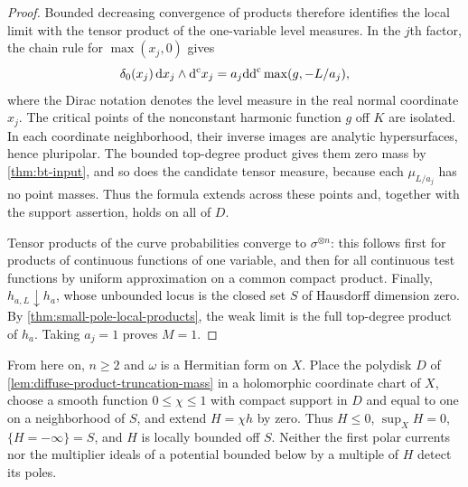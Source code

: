 \begin{proof}
Bounded decreasing convergence of products therefore identifies the local limit with the tensor product of the one-variable level measures. In the $j$th factor, the chain rule for $\max(x_j,0)$ gives
\[
 \delta_0(x_j)\,\mathrm dx_j\wedge\mathrm d^{\mathrm c} x_j
      =a_j\mathrm{dd}^{\mathrm{c}}\max(g,-L/a_j),
\]
where the Dirac notation denotes the level measure in the real normal coordinate $x_j$. The critical points of the nonconstant harmonic function $g$ off $K$ are isolated. In each coordinate neighborhood, their inverse images are analytic hypersurfaces, hence pluripolar. The bounded top-degree product gives them zero mass by \cref{thm:bt-input}, and so does the candidate tensor measure, because each $\mu_{L/a_j}$ has no point masses. Thus the formula extends across these points and, together with the support assertion, holds on all of $D$.

Tensor products of the curve probabilities converge to $\sigma^{\otimes n}$: this follows first for products of continuous functions of one variable, and then for all continuous test functions by uniform approximation on a common compact product. Finally, $h_{a,L}\downarrow h_a$, whose unbounded locus is the closed set $S$ of Hausdorff dimension zero. By \cref{thm:small-pole-local-products}, the weak limit is the full top-degree product of $h_a$. Taking $a_j=1$ proves $M=1$.
\end{proof}

From here on, $n\geq2$ and $\omega$ is a Hermitian form on $X$. Place the polydisk $D$ of \cref{lem:diffuse-product-truncation-mass} in a holomorphic coordinate chart of $X$, choose a smooth function $0\leq\chi\leq1$ with compact support in $D$ and equal to one on a neighborhood of $S$, and extend $H=\chi h$ by zero. Thus $H\leq0$, $\sup_XH=0$, $\{H=-\infty\}=S$, and $H$ is locally bounded off $S$. Neither the first polar currents nor the multiplier ideals of a potential bounded below by a multiple of $H$ detect its poles.

